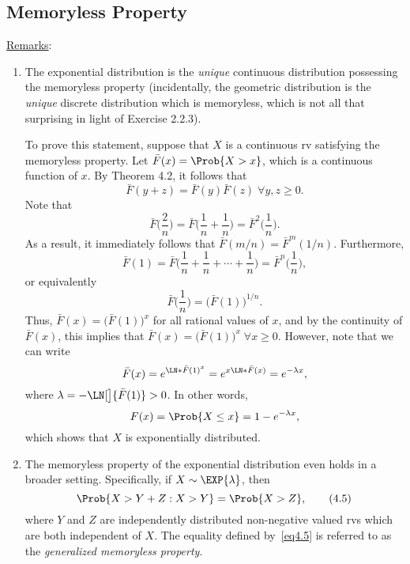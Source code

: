 \subsection*{Memoryless Property}
\underline{Remarks}:
\begin{enumerate}[(1)]
    \item The exponential distribution is the \emph{unique} continuous distribution possessing the
          memoryless property (incidentally, the geometric distribution is the \emph{unique} discrete
          distribution which is memoryless, which is not all that surprising in light of Exercise 2.2.3).

          To prove this statement, suppose that $ X $ is a continuous rv satisfying the memoryless property. Let $ \bar{F}(x)=\Prob{X>x} $,
          which is a continuous function of $ x $. By Theorem 4.2, it follows that
          \[ \bar{F}(y+z)=\bar{F}(y)\bar{F}(z)\; \forall y,z\ge 0. \]
          Note that
          \[ \bar{F}\biggl(\frac{2}{n}\biggr)=\bar{F}\biggl(\frac{1}{n}+\frac{1}{n}\biggr)=\bar{F}^2\biggl(\frac{1}{n}\biggr). \]
          As a result, it immediately follows that $ \bar{F}(m/n)=\bar{F}^m(1/n) $. Furthermore,
          \[ \bar{F}(1)=\bar{F}\biggl(\frac{1}{n}+\frac{1}{n}+\cdots+\frac{1}{n}\biggr)=\bar{F}^n\biggl(\frac{1}{n}\biggr), \]
          or equivalently
          \[ \bar{F}\biggl(\frac{1}{n}\biggr)=\bigl(\bar{F}(1)\bigr)^{1/n}. \]
          Thus, $ \bar{F}(x)=\bigl(\bar{F}(1)\bigr)^x $ for all rational values of $ x $, and by the continuity of $ \bar{F}(x) $,
          this implies that $ \bar{F}(x)=\bigl(\bar{F}(1)\bigr)^x\; \forall x\ge 0 $. However, note that we can write
          \[ \bar{F}(x)=e^{\LN*{\bar{F}(1)}^x}=e^{x\LN*{\bar{F}(x)}}=e^{-\lambda x}, \]
          where $ \lambda=-\LN[\big]{\bar{F}(1)}>0 $. In other words,
          \[ F(x)=\Prob{X\le x}=1-e^{-\lambda x}, \]
          which shows that $ X $ is exponentially distributed.
    \item The memoryless property of the exponential distribution even holds in a broader setting. Specifically, if $ X \sim \EXP{\lambda} $,
          then
          \[ \Prob{X>Y+Z\given X>Y}=\Prob{X>Z},\tag*{(4.5)}\label{eq4.5} \]
          where $Y$ and $Z$ are independently distributed non-negative valued rvs which are both
          independent of $X$. The equality defined by~\ref{eq4.5} is referred to as the \emph{generalized
              memoryless property}.


\end{enumerate}
